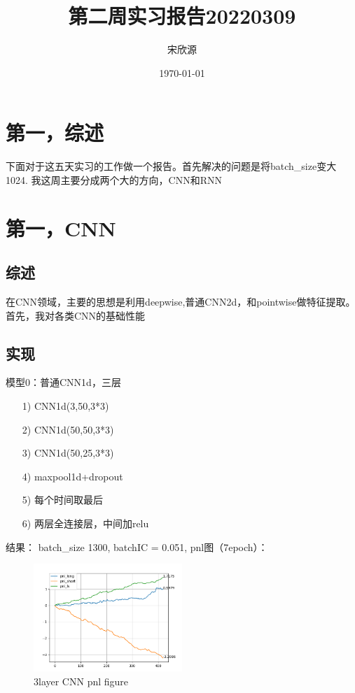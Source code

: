 \documentclass[11pt]{ctexart}
\begin{document}
\title{第二周实习报告20220309}
\author{宋欣源}
\date{\today}

\maketitle %


\section{第一，综述}

下面对于这五天实习的工作做一个报告。首先解决的问题是将batch_size变大1024.
我这周主要分成两个大的方向，CNN和RNN

\section{第一，CNN}
\subsection{综述}
在CNN领域，主要的思想是利用deepwise,普通CNN2d，和pointwise做特征提取。首先，我对各类CNN的基础性能

\subsection{实现}
模型0：普通CNN1d，三层
\begin{itemize}
  \item [1)]
  CNN1d(3,50,3*3)
  \item [2)]
  CNN1d(50,50,3*3)
  \item [3)]
  CNN1d(50,25,3*3)
  \item [4)]
  maxpool1d+dropout
  \item [5)]
  每个时间取最后
  \item [6)]
  两层全连接层，中间加relu

\end{itemize}
结果： batch\_size 1300, batchIC = 0.051,
pnl图（7epoch）：
\begin{figure}[h!]
\begin{center}
\includegraphics[width=0.5\textwidth]{2.PNG}
\end{center}
\caption{3layer CNN pnl figure}
\label{FIG.1}
\end{figure}
\end{document}
